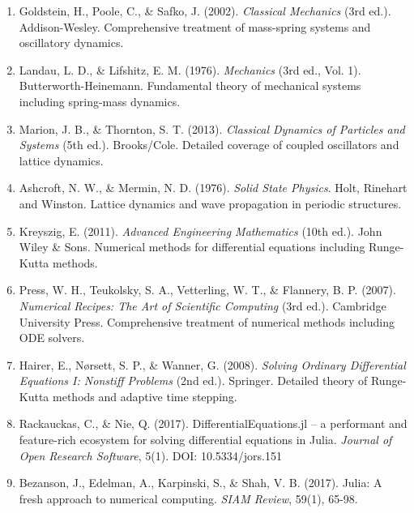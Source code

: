 \documentclass[11pt,a4paper]{article}
\begin{document}
\begin{enumerate}
    \item \label{ref:goldstein2002} Goldstein, H., Poole, C., \& Safko, J. (2002). \textit{Classical Mechanics} (3rd ed.). Addison-Wesley. Comprehensive treatment of mass-spring systems and oscillatory dynamics.
    
    \item \label{ref:landau1976} Landau, L. D., \& Lifshitz, E. M. (1976). \textit{Mechanics} (3rd ed., Vol. 1). Butterworth-Heinemann. Fundamental theory of mechanical systems including spring-mass dynamics.
    
    \item \label{ref:marion2013} Marion, J. B., \& Thornton, S. T. (2013). \textit{Classical Dynamics of Particles and Systems} (5th ed.). Brooks/Cole. Detailed coverage of coupled oscillators and lattice dynamics.
    
    \item \label{ref:ashcroft1976} Ashcroft, N. W., \& Mermin, N. D. (1976). \textit{Solid State Physics}. Holt, Rinehart and Winston. Lattice dynamics and wave propagation in periodic structures.
    
    \item \label{ref:kreyszig2011} Kreyszig, E. (2011). \textit{Advanced Engineering Mathematics} (10th ed.). John Wiley \& Sons. Numerical methods for differential equations including Runge-Kutta methods.
    
    \item \label{ref:press2007} Press, W. H., Teukolsky, S. A., Vetterling, W. T., \& Flannery, B. P. (2007). \textit{Numerical Recipes: The Art of Scientific Computing} (3rd ed.). Cambridge University Press. Comprehensive treatment of numerical methods including ODE solvers.
    
    \item \label{ref:hairer2008} Hairer, E., Nørsett, S. P., \& Wanner, G. (2008). \textit{Solving Ordinary Differential Equations I: Nonstiff Problems} (2nd ed.). Springer. Detailed theory of Runge-Kutta methods and adaptive time stepping.
    
    \item \label{ref:rackauckas2017} Rackauckas, C., \& Nie, Q. (2017). DifferentialEquations.jl – a performant and feature-rich ecosystem for solving differential equations in Julia. \textit{Journal of Open Research Software}, 5(1). DOI: 10.5334/jors.151
    
    \item \label{ref:bezanson2017} Bezanson, J., Edelman, A., Karpinski, S., \& Shah, V. B. (2017). Julia: A fresh approach to numerical computing. \textit{SIAM Review}, 59(1), 65-98.
    

\end{enumerate}
\end{document}
